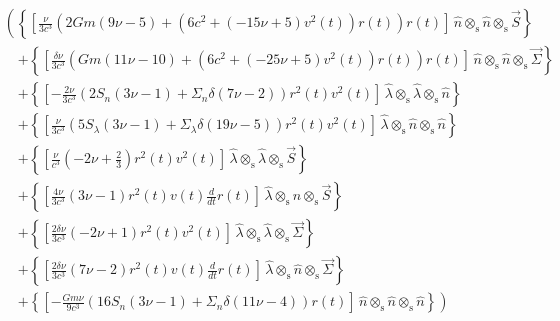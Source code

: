 \begin{align*}&\left( \left\{ \left[ \frac{\nu}{3 c^{3}} \left(2 Gm \left(9 \nu - 5\right) + \left(6 c^{2} + \left(- 15 \nu + 5\right) v^{2}{\left (t \right )}\right) r{\left (t \right )}\right) r{\left (t \right )} \right]\, \hat{n} \otimes_{\mathrm{s}} \hat{n} \otimes_{\mathrm{s}} \vec{S} \right\} \right. \nonumber \\&\quad \left. + \left\{ \left[ \frac{\delta \nu}{3 c^{3}} \left(Gm \left(11 \nu - 10\right) + \left(6 c^{2} + \left(- 25 \nu + 5\right) v^{2}{\left (t \right )}\right) r{\left (t \right )}\right) r{\left (t \right )} \right]\, \hat{n} \otimes_{\mathrm{s}} \hat{n} \otimes_{\mathrm{s}} \vec{\Sigma} \right\} \right. \nonumber \\&\quad \left. + \left\{ \left[ - \frac{2 \nu}{3 c^{3}} \left(2 S_{n} \left(3 \nu - 1\right) + \Sigma_{n} \delta \left(7 \nu - 2\right)\right) r^{2}{\left (t \right )} v^{2}{\left (t \right )} \right]\, \hat{\lambda} \otimes_{\mathrm{s}} \hat{\lambda} \otimes_{\mathrm{s}} \hat{n} \right\} \right. \nonumber \\&\quad \left. + \left\{ \left[ \frac{\nu}{3 c^{3}} \left(5 S_{\lambda} \left(3 \nu - 1\right) + \Sigma_{\lambda} \delta \left(19 \nu - 5\right)\right) r^{2}{\left (t \right )} v^{2}{\left (t \right )} \right]\, \hat{\lambda} \otimes_{\mathrm{s}} \hat{n} \otimes_{\mathrm{s}} \hat{n} \right\} \right. \nonumber \\&\quad \left. + \left\{ \left[ \frac{\nu}{c^{3}} \left(- 2 \nu + \frac{2}{3}\right) r^{2}{\left (t \right )} v^{2}{\left (t \right )} \right]\, \hat{\lambda} \otimes_{\mathrm{s}} \hat{\lambda} \otimes_{\mathrm{s}} \vec{S} \right\} \right. \nonumber \\&\quad \left. + \left\{ \left[ \frac{4 \nu}{3 c^{3}} \left(3 \nu - 1\right) r^{2}{\left (t \right )} v{\left (t \right )} \frac{d}{d t} r{\left (t \right )} \right]\, \hat{\lambda} \otimes_{\mathrm{s}} \hat{n} \otimes_{\mathrm{s}} \vec{S} \right\} \right. \nonumber \\&\quad \left. + \left\{ \left[ \frac{2 \delta \nu}{3 c^{3}} \left(- 2 \nu + 1\right) r^{2}{\left (t \right )} v^{2}{\left (t \right )} \right]\, \hat{\lambda} \otimes_{\mathrm{s}} \hat{\lambda} \otimes_{\mathrm{s}} \vec{\Sigma} \right\} \right. \nonumber \\&\quad \left. + \left\{ \left[ \frac{2 \delta \nu}{3 c^{3}} \left(7 \nu - 2\right) r^{2}{\left (t \right )} v{\left (t \right )} \frac{d}{d t} r{\left (t \right )} \right]\, \hat{\lambda} \otimes_{\mathrm{s}} \hat{n} \otimes_{\mathrm{s}} \vec{\Sigma} \right\} \right. \nonumber \\&\quad \left. + \left\{ \left[ - \frac{Gm \nu}{9 c^{3}} \left(16 S_{n} \left(3 \nu - 1\right) + \Sigma_{n} \delta \left(11 \nu - 4\right)\right) r{\left (t \right )} \right]\, \hat{n} \otimes_{\mathrm{s}} \hat{n} \otimes_{\mathrm{s}} \hat{n} \right\} \right)\\\end{align*}